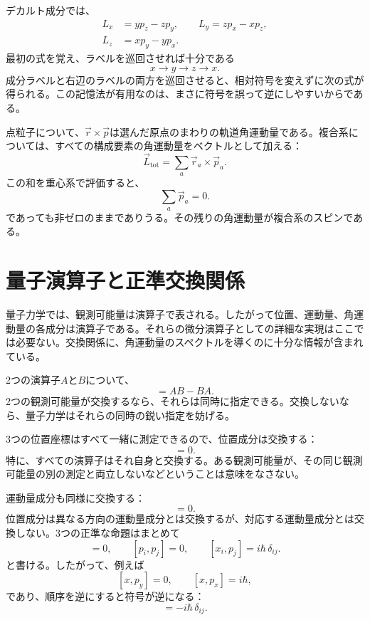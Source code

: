 デカルト成分では、
\begin{equation}
\begin{aligned}
L_x&=yp_z-zp_y,\qquad
L_y=zp_x-xp_z,\\
L_z&=xp_y-yp_x.
\end{aligned}
\end{equation}
最初の式を覚え、ラベルを巡回させれば十分である
\[
x\longrightarrow y\longrightarrow z\longrightarrow x.
\]
成分ラベルと右辺のラベルの両方を巡回させると、相対符号を変えずに次の式が得られる。この記憶法が有用なのは、まさに符号を誤って逆にしやすいからである。

点粒子について、\(\vec r\times\vec p\)は選んだ原点のまわりの軌道角運動量である。複合系については、すべての構成要素の角運動量をベクトルとして加える：
\begin{equation}
\vec L_{\mathrm{tot}}=\sum_a \vec r_a\times\vec p_a.
\end{equation}
この和を重心系で評価すると、
\[
\sum_a\vec p_a=0.
\]
であっても非ゼロのままでありうる。その残りの角運動量が複合系のスピンである。

\section{量子演算子と正準交換関係}

量子力学では、観測可能量は演算子で表される。したがって位置、運動量、角運動量の各成分は演算子である。それらの微分演算子としての詳細な実現はここでは必要ない。交換関係に、角運動量のスペクトルを導くのに十分な情報が含まれている。

2つの演算子\(A\)と\(B\)について、
\begin{equation}
[A,B]=AB-BA.
\end{equation}
2つの観測可能量が交換するなら、それらは同時に指定できる。交換しないなら、量子力学はそれらの同時の鋭い指定を妨げる。

3つの位置座標はすべて一緒に測定できるので、位置成分は交換する：
\begin{equation}
[x_i,x_j]=0.
\end{equation}
特に、すべての演算子はそれ自身と交換する。ある観測可能量が、その同じ観測可能量の別の測定と両立しないなどということは意味をなさない。

運動量成分も同様に交換する：
\begin{equation}
[p_i,p_j]=0.
\end{equation}
位置成分は異なる方向の運動量成分とは交換するが、対応する運動量成分とは交換しない。3つの正準な命題はまとめて
\begin{equation}
[x_i,x_j]=0,\qquad
[p_i,p_j]=0,\qquad
[x_i,p_j]=i\hbar\,\delta_{ij}.
\end{equation}
と書ける。したがって、例えば
\[
[x,p_y]=0,\qquad [x,p_x]=i\hbar,
\]
であり、順序を逆にすると符号が逆になる：
\begin{equation}
[p_j,x_i]=-i\hbar\,\delta_{ij}.
\end{equation}

